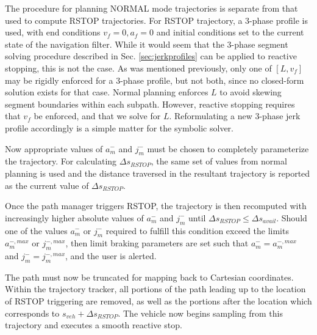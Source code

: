 \documentclass[letterpaper, 10 pt, conference]{ieeeconf}  %
\begin{document}
The procedure for planning NORMAL mode trajectories is separate from that used to compute RSTOP trajectories.
For RSTOP trajectory, a 3-phase profile is used, with end conditions $v_f=0, a_f=0$ and initial conditions set to the current state of the navigation filter.
While it would seem that the 3-phase segment solving procedure described in Sec. 
\ref{sec:jerkprofiles} can be applied to reactive stopping, this is not the case.
As was mentioned previously, only one of $[L, v_f]$ may be rigidly enforced for a 3-phase profile, but not both, since no closed-form solution exists for that case.
Normal planning enforces $L$ to avoid skewing segment boundaries within each subpath.
However, reactive stopping requires that $v_f$ be enforced, and that we solve for $L$.
Reformulating a new 3-phase jerk profile accordingly is a simple matter for the symbolic solver.

Now appropriate values of $a_m^-$ and $j_m^-$ must be chosen to completely parameterize the trajectory.
For calculating $\Delta s_{RSTOP}$, the same set of values from normal planning is used and the distance traversed in the resultant trajectory is reported as the current value of $\Delta s_{RSTOP}$.

Once the path manager triggers RSTOP, the trajectory is then recomputed with increasingly higher absolute values of $a_m^-$ and $j_m^-$ until $\Delta s_{RSTOP} \leqslant \Delta s_{avail}$.
Should one of the values $a_m^-$ or $j_m^-$ required to fulfill this condition exceed the limits $a_m^{-,max}$ or $j_m^{-,max}$, then limit braking parameters are set such that $a_m^-=a_m^{-,max}$ and $j_m^-=j_m^{-,max}$, and the user is alerted.

The path must now be truncated for mapping back to Cartesian coordinates.
Within the trajectory tracker, all portions of the path leading up to the location of RSTOP triggering are removed, as well as the portions after the location which corresponds to $s_{veh} + \Delta s_{RSTOP}$.
The vehicle now begins sampling from this trajectory and executes a smooth reactive stop.

\end{document}
